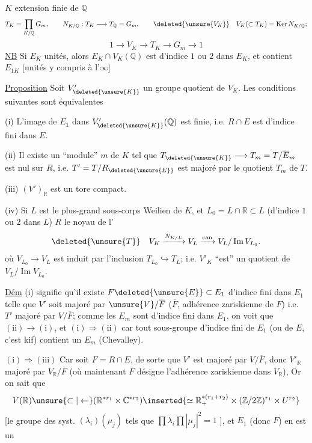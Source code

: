 $K$ extension finie de $\mathbb Q$
\[
T_K=\prod_{K/\mathbb Q}G_m,\qquad
N_{K/\mathbb Q}:T_K\longrightarrow T_{\mathbb Q}=G_m,\qquad
\deleted{\unsure{V_K}}\quad V_K(\subset T_K)=\operatorname{Ker}N_{K/\mathbb Q};
\]
\[
1\longrightarrow V_K\longrightarrow T_K\longrightarrow G_m\longrightarrow1
\]
\uline{NB} Si $E_K$ unités, alors $E_K\cap V_K(\mathbb Q)$ est d'indice $1$ ou $2$
dans $E_K$, et contient $E_{1K}$ [unités  y compris à l'$\infty$]

\uline{Proposition} Soit $V'_{\deleted{\unsure{K}}}$  un groupe quotient de $V_K$.
Les conditions suivantes sont équivalentes

(i) L'image de $E_1$ dans $V'_{\deleted{\unsure{K}}}(\mathbb Q)$ est finie, i.e.
$R\cap E$ est d'indice fini dans $E$.

(ii) Il existe un ``module'' $m$ de $K$ tel que
$T_{\deleted{\unsure{K}}}\longrightarrow T_m=T/\overline E_m$
est nul sur $R$, i.e. $T'=T/R_{\deleted{\unsure{E}}}$ est majoré par le quotient $T_m$ de $T$.

(iii) $(V')_{\mathbb R}$ est un tore compact.

(iv) Si $L$  est le plus-grand sous-corps Weilien de $K$, et
$L_0=L\cap\mathbb R\subset L$ (d'indice $1$ ou $2$ dans $L$)
$R$   le noyau de l'
\[
\deleted{\unsure{T}}\quad
V_K\xrightarrow{N_{K/L}}V_L\xrightarrow{\mathrm{can}}V_L/\operatorname{Im}V_{L_0}.
\]
où $V_{L_0}\longrightarrow V_L$ est induit par l'inclusion
$T_{L_0}\hookrightarrow T_L$; i.e.
$V'_K$ ``est'' un quotient de $V_L/\operatorname{Im}V_{L_0}$.

\uline{Dém} (i) signifie qu'il existe $F\deleted{\unsure{E}}\subset E_1$
 d'indice fini dans $E_1$ telle que $V'$ soit majoré par
$\unsure{V}/\overline F$ ($\overline F$, adhérence zariskienne de $F$)
i.e. $T'$ majoré par $V/\overline F$; comme les $E_m$ sont d'indice fini
dans $E_1$, on voit que $(\mathrm{ii})\longrightarrow(\mathrm{i})$, et
$(\mathrm{i})\Rightarrow(\mathrm{ii})$ car tout sous-groupe d'indice fini de $E_1$
 (ou de $E$, c'est kif) contient un $E_m$ (Chevalley).

$(\mathrm{i})\Longrightarrow(\mathrm{iii})$ Car soit 
$F=R\cap E$, de sorte que $V'$ est majoré par $V/\overline F$,
 donc $V'_{\mathbb R}$ majoré par $V_{\mathbb R}/\overline F$
(où maintenant $\overline F$ désigne l'adhérence zariskienne dans $V_{\mathbb R}$),
Or on sait que
\[
V(\mathbb R)\unsure{\subset|\leftarrow}
(\mathbb R^{*r_1}\times\mathbb C^{*r_2})
\inserted{\simeq\mathbb R_+^{*(r_1+r_2)}\times(\mathbb Z/2\mathbb Z)^{r_1}\times U^{r_2}}
\]
[le   groupe des syst. $(\lambda_i)(\mu_j)$
tels que $\prod\lambda_i\prod|\mu_j|^2=1$
],
et $E_1$ (donc $F$) en est un
